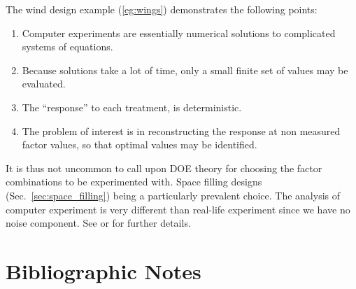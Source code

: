 The wind design example (\ref{eg:wings}) demonstrates the following points:
\begin{enumerate}
\item Computer experiments are essentially numerical solutions to complicated systems of equations.
\item Because solutions take a lot of time, only a small finite set of values may be evaluated. 
\item The ``response'' to each treatment, is deterministic. 
\item The problem of interest is in reconstructing the response at non measured factor values, so that optimal values may be identified. 
\end{enumerate}
It is thus not uncommon to call upon DOE theory for choosing the factor combinations to be experimented with. Space filling designs (Sec.~\ref{sec:space_filling}) being a particularly prevalent choice. 
The analysis of computer experiment is very different than real-life experiment since we have no noise component. 
See \cite{sacks_design_1989} or \cite{santner_design_2013} for further details. 



\section{Bibliographic Notes}
